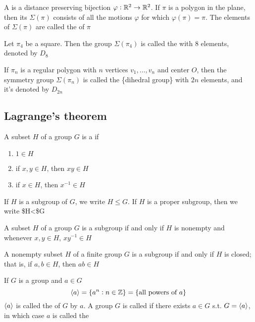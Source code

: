 \documentclass[11pt]{article}
\begin{document}
\begin{definition}[]
A  is a distance preserving bijection \(\varphi:\mathbb{R}^2\to\mathbb{R}^2\). If
\(\pi\) is a polygon in the plane, then its  \(\Sigma(\pi)\)
consists of all the motions \(\varphi\) for which \(\varphi(\pi)=\pi\). The
elements of \(\Sigma(\pi)\) are called the  of \(\pi\)
\end{definition}

Let \(\pi_4\) be a square. Then the group \(\Sigma(\pi_4)\) is called the
 with 8 elements, denoted by \(D_8\)

\begin{definition}[]
If \(\pi_n\) is a regular polygon with \(n\) vertices \(v_1,\dots,v_n\) and center
\(O\), then the symmetry group \(\Sigma(\pi_n)\) is called the \tf\{dihedral
group\} with \(2n\) elements, and it's denoted by \(D_{2n}\)
\end{definition}
\subsection{Lagrange's theorem}
\label{sec:org092818e}
\begin{definition}[]
A subset \(H\) of a group \(G\) is a  if
\begin{enumerate}
\item \(1\in H\)
\item if \(x,y\in H\), then \(xy\in H\)
\item if \(x\in H\), then \(x^{-1}\in H\)
\end{enumerate}
\end{definition}

If \(H\) is a subgroup of \(G\), we write \(H\le G\). If \(H\) is a proper subgroup,
then we write \$H<\$G

\begin{proposition}[]
A subset \(H\) of a group \(G\) is a subgroup if and only if \(H\) is nonempty and
whenever \(x,y\in H\), \(xy^{-1}\in H\)
\end{proposition}

\begin{proposition}[]
A nonempty subset \(H\) of a finite group \(G\) is a subgroup if and only if \(H\)
is closed; that is, if \(a,b\in H\), then \(ab\in H\)
\end{proposition}

\begin{definition}[]
If \(G\) is a group and \(a\in G\)
\begin{equation*}
\langle a\rangle=\{a^n:n\in\mathbb{Z}\}=\{\text{all powers of } a\}
\end{equation*}
\(\langle a\rangle\) is called the  of \(G\)  by \(a\). A
group \(G\) is called  if there exists \(a\in G\) s.t. \(G=\langle a\rangle\),
in which case \(a\) is called the 
\end{definition}
\end{document}
